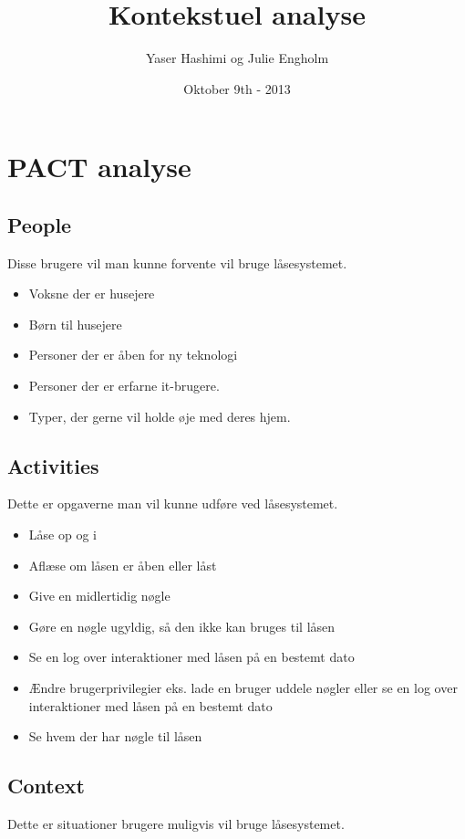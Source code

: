 \documentclass[a4paper,12pt]{article}
\title{Kontekstuel analyse}
\author{Yaser Hashimi og Julie Engholm}
\date{Oktober 9th - 2013}
\begin{document}
\maketitle %
\newpage
\tableofcontents %
\newpage

\clearpage %

\section{PACT analyse}
\subsection{People}
Disse brugere vil man kunne forvente vil bruge låsesystemet.

\begin{itemize}
    \item Voksne der er husejere
    \item Børn til husejere
    \item Personer der er åben for ny teknologi
    \item Personer der er erfarne it-brugere.
    \item Typer, der gerne vil holde øje med deres hjem.
\end{itemize}

\subsection{Activities}
Dette er opgaverne man vil kunne udføre ved låsesystemet.

\begin{itemize}
    \item Låse op og i
    \item Aflæse om låsen er åben eller låst
    \item Give en midlertidig nøgle
    \item Gøre en nøgle ugyldig, så den ikke kan bruges til låsen
    \item Se en log over interaktioner med låsen på en bestemt dato
    \item Ændre brugerprivilegier eks. lade en bruger uddele nøgler eller se en log over interaktioner med låsen på en bestemt dato
    \item Se hvem der har nøgle til låsen
\end{itemize}


\subsection{Context}
Dette er situationer brugere muligvis vil bruge låsesystemet.
\end{document}
